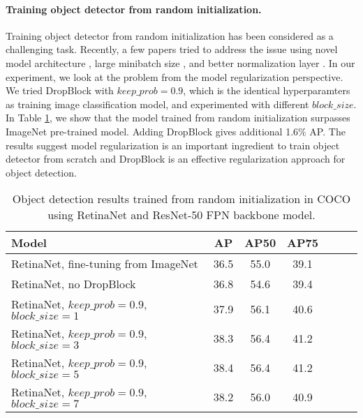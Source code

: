 \documentclass{article}
\begin{document}
\paragraph{Training object detector from random initialization.}
Training object detector from random initialization has been considered as a challenging task. Recently, a few papers tried to address the issue using novel model architecture \cite{shen2017dsod}, large minibatch size \cite{peng2018dmegdet}, and better normalization layer \cite{wu2018gn}. In our experiment, we look at the problem from the model regularization perspective. We tried DropBlock with $keep\_prob=0.9$, which is the identical hyperparamters as training image classification model, and experimented with different $block\_size$. In Table \ref{table:retinanet}, we show that the model trained from random initialization surpasses ImageNet pre-trained model. Adding DropBlock gives additional 1.6\% AP. The results suggest model regularization is an important ingredient to train object detector from scratch and DropBlock is an effective regularization approach for object detection.

\begin{table}[h!]
\setlength{\tabcolsep}{8pt}
\begin{center}
\small
\begin{tabular}{l|cccccc}
\hline
  \footnotesize Model  & \footnotesize AP & \footnotesize AP50 & \footnotesize AP75 \\
\hline \hline
\footnotesize RetinaNet, fine-tuning from ImageNet & 36.5 & 55.0 & 39.1  \\
\hline
\footnotesize RetinaNet, no DropBlock            & 36.8 & 54.6 & 39.4 \\
\footnotesize RetinaNet, $keep\_prob=0.9$, $block\_size=1$  & 37.9 & 56.1 & 40.6 \\
\footnotesize RetinaNet, $keep\_prob=0.9$, $block\_size=3$  & 38.3 & 56.4 & 41.2 \\
\footnotesize RetinaNet, $keep\_prob=0.9$, $block\_size=5$  & 38.4 & 56.4 & 41.2 \\
\footnotesize RetinaNet, $keep\_prob=0.9$, $block\_size=7$  & 38.2 & 56.0 & 40.9 \\
\hline
\end{tabular}
\end{center}
\caption{Object detection results trained from random initialization in COCO using RetinaNet and ResNet-50 FPN backbone model.}
\label{table:retinanet}
\end{table}
\end{document}
